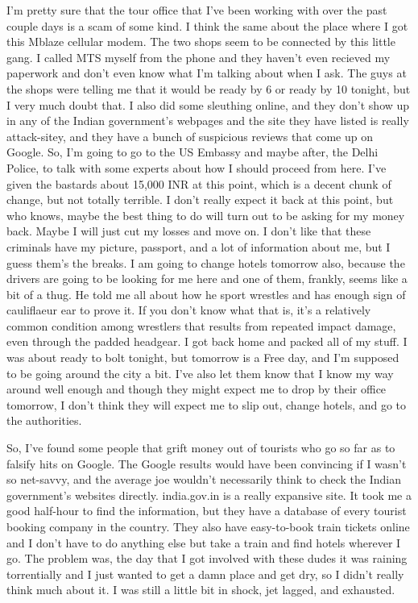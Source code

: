 \documentclass[11pt]{amsart}
\begin{document}
I'm pretty sure that the tour office that I've been working with over the past couple days is a scam of some kind.  I think the same about the place where I got this Mblaze cellular modem. The two shops seem to be connected by this little gang. I called MTS myself from the phone and they haven't even recieved my paperwork and don't even know what I'm talking about when I ask. The guys at the shops were telling me that it would be ready by 6 or ready by 10 tonight, but I very much doubt that. I also did some sleuthing online, and they don't show up in any of the Indian government's webpages and the site they have listed is really attack-sitey, and they have a bunch of suspicious reviews that come up on Google. So, I'm going to go to the US Embassy and maybe after, the Delhi Police, to talk with some experts about how I should proceed from here. I've given the bastards about 15,000 INR at this point, which is a decent chunk of change, but not totally terrible. I don't really expect it back at this point, but who knows, maybe the best thing to do will turn out to be asking for my money back. Maybe I will just cut my losses and move on. I don't like that these criminals have my picture, passport, and a lot of information about me, but I guess them's the breaks. I am going to change hotels tomorrow also, because the drivers are going to be looking for me here and one of them, frankly, seems like a bit of a thug. He told me all about how he sport wrestles and has enough sign of cauliflaeur ear to prove it. If you don't know what that is, it's a relatively common condition among wrestlers that results from repeated impact damage, even through the padded headgear. I got back home and packed all of my stuff. I was about ready to bolt tonight, but tomorrow is a Free day, and I'm supposed to be going around the city a bit. I've also let them know that I know my way around well enough and though they might expect me to drop by their office tomorrow, I don't think they will expect me to slip out, change hotels, and go to the authorities.

So, I've found some people that grift money out of tourists who go so far as to falsify hits on Google. The Google results would have been convincing if I wasn't so net-savvy, and the average joe wouldn't necessarily think to check the Indian government's websites directly. india.gov.in is a really expansive site. It took me a good half-hour to find the information, but they have a database of every tourist booking company in the country. They also have easy-to-book train tickets online and I don't have to do anything else but take a train and find hotels wherever I go. The problem was, the day that I got involved with these dudes it was raining torrentially and I just wanted to get a damn place and get dry, so I didn't really think much about it. I was still a little bit in shock, jet lagged, and exhausted.
\end{document}
